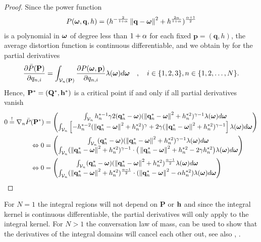 \documentclass[smallabstract,smallcaptions]{dccpaper}
\newif\ifarxiv\arxivfalse
\newenvironment{remark}{\par\vspace{1.5ex}\noindent{\em Remark\/}.}{\par\vspace{1.5ex}}
\renewcommand{\vq}{\mathbf p}
\renewcommand{\vp}{\mathbf q}
\renewcommand{\vQ}{\mathbf P}
\renewcommand{\vP}{\mathbf Q}
\newcommand{\df}{\ensuremath{\lam}}         %
\newcommand{\Pbar}{\ensuremath{\bar{P}}}         %
\newcommand{\Vor}{\ensuremath{\mathcal{V}}}         %
\begin{document}
\begin{proof}
Since the power function 
%
\begin{align}
  P(\vome,\vp,h)= (h^{-\frac{2}{1+\alp}}\Norm{\vp-\vome}^2 + h^{\frac{2\alp}{1+\alp}})^{\frac{\alp+1}{2}}
\end{align}  
%
is a polynomial in $\boldsymbol{ \omega}$ of degree less than $1+\alpha$ for each fixed $\vq=(\vp,h)$, the average distortion function is continuous
differentiable, and we obtain by \cite[Thm.1]{WJ18} for the partial derivatives 
%
\begin{align}
  \frac{\partial \Pbar(\vQ)}{\partial q_{n,i}} = \int_{\Vor_n(\vQ)} \frac{\partial P(\vome,\vq)}{\partial q_{n,i}}
  \df(\vome)d\vome\quad,\quad i\in\{1,2,3\},n\in\{1,2,\dots,N\}.
\end{align}
%
Hence, $\vQ^*=(\vP^*,\vh^*)$ is a critical point if and only if all partial derivatives vanish 
%
\begin{align}
 0\overset{!}{=} \nabla_n \Pbar(\vQ^*) &= \begin{pmatrix} 
   \int_{\Vor_n} h_n^{*-1} \gam 2 (\vp^*_{n}-\vome)  (\Norm{\vp_n^*-\vome}^2 +h_n^{*2})^{\gam-1}  \df(\vome)d \vome\\
   \int_{\Vor_n} \left[-h_n^{*-2}(\Norm{\vp^*_n-\vome}^2 + h_n^{*2})^{\gam} + 2\gam (\Norm{\vp_n^*-\vome}^2 +h_n^{*2})^{\gam-1}\right]
    \df(\vome)d \vome
  \end{pmatrix} \notag\\
\LRA 0&= \begin{pmatrix}
  \int_{\Vor_n} (\vp^*_{n}-\vome) (\Norm{\vp^*_n-\vome}^2 +h_n^{*2})^{\gam-1} \df(\vome)d \vome\\
  \int_{\Vor_n} (\Norm{\vp^*_n-\vome}^2 +h_n^{*2})^{\gam-1}\cdot \big(\Norm{\vp^*_n-\vome}^2+h_n^{*2} - 2\gam h_n^{*2} \big)
  \df(\vome)d \vome
 \end{pmatrix}\notag\\
 \LRA 0&= \begin{pmatrix}
   \int_{\Vor_n} (\vp_{n}^*-\vome) (\Norm{\vp^*_n-\vome}^2 +h_n^{*2})^{\frac{\alp-1}{2}} \df(\vome)d \vome\\
   \int_{\Vor_n} (\Norm{\vp_n^*-\vome}^2 +h_n^{*2})^{\frac{\alp-1}{2}}\cdot (\Norm{\vp_n^*-\vome}^2 - \alp h_n^{*2} )
   \df(\vome)d \vome
  \end{pmatrix}\label{eq:graddph}
\end{align}
%
\end{proof}
%
\fi
For $N=1$ the integral regions will not depend on $\vQ$ or ${\mathbf h}$ and since the integral kernel is continuous differentiable, the
partial derivatives will only apply to the integral kernel. For $N>1$ the conversation law of mass, can be used to show
that the derivatives of the integral domains will cancel each other out, see also \cite{WJ18}, \cite{CMB05}. 
%
\ifarxiv
\begin{remark}
  The shape of the regions depend on the parameters, which if different for each quantization point (heterogeneous),
  generate spherical and not polyhedral regions. We will show later, that homogeneous parameter selection with polyhedral
  regions will be the optimal regions for $d=1$. 
\end{remark}
\fi
\end{document}
